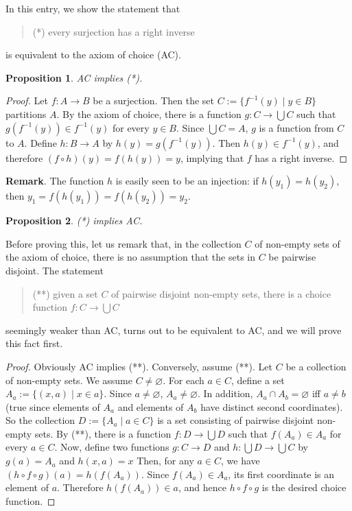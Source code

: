 \documentclass[12pt]{article}
\newtheorem{prop}{Proposition}
\begin{document}
In this entry, we show the statement that
\begin{quote}
(*) every surjection has a right inverse
\end{quote}
is equivalent to the axiom of choice (AC).

\begin{prop}  AC implies (*). \end{prop}
\begin{proof}
Let $f:A\to B$ be a surjection.  Then the set $C:=\lbrace f^{-1}(y)\mid y\in B\rbrace$ partitions $A$.  By the axiom of choice, there is a function $g:C\to \bigcup C$ such that $g(f^{-1}(y))\in f^{-1}(y)$ for every $y\in B$.  Since $\bigcup C=A$, $g$ is a function from $C$ to $A$.  Define $h:B\to A$ by $h(y)=g(f^{-1}(y))$.  Then $h(y)\in f^{-1}(y)$, and therefore $(f\circ h)(y)=f(h(y))=y$, implying that $f$ has a right inverse.
\end{proof}

\textbf{Remark}.  The function $h$ is easily seen to be an injection: if $h(y_1)=h(y_2)$, then $y_1 = f(h(y_1))=f(h(y_2)) = y_2$.

\begin{prop}  (*) implies AC. \end{prop}

Before proving this, let us remark that, in the collection $C$ of non-empty sets of the axiom of choice, there is no assumption that the sets in $C$ be pairwise disjoint.  The statement
\begin{quote}  (**) given a set $C$ of pairwise disjoint non-empty sets, there is a choice function $f:C\to \bigcup C$
\end{quote}
seemingly weaker than AC, turns out to be equivalent to AC, and we will prove this fact first.
\begin{proof}
Obviously AC implies (**).  Conversely, assume (**).  Let $C$ be a collection of non-empty sets.  We assume $C\ne \varnothing$.  For each $a\in C$, define a set $A_a:=\lbrace (x,a)\mid x\in a\rbrace$.  Since $a\ne \varnothing$, $A_a\ne \varnothing$.  In addition, $A_a\cap A_b= \varnothing$ iff $a\ne b$ (true since elements of $A_a$ and elements of $A_b$ have distinct second coordinates).  So the collection $D:=\lbrace A_a\mid a\in C\rbrace$ is a set consisting of pairwise disjoint non-empty sets.  By (**), there is a function $f:D\to \bigcup D$ such that $f(A_a)\in A_a$ for every $a\in C$.  Now, define two functions $g: C\to D$ and $h:\bigcup D\to \bigcup C$ by $g(a)=A_a$ and $h(x,a)=x$  Then, for any $a\in C$, we have $(h\circ f \circ g)(a)=h(f(A_a))$.  Since $f(A_a)\in A_a$, its first coordinate is an element of $a$.  Therefore $h(f(A_a))\in a$, and hence $h\circ f\circ g$ is the desired choice function.
\end{proof}
\end{document}
